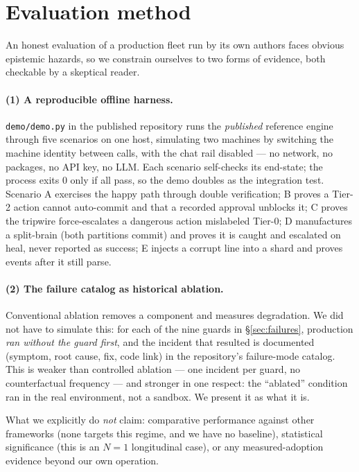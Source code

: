 \documentclass[11pt]{article}
\begin{document}
\section{Evaluation method}\label{sec:eval-method}
An honest evaluation of a production fleet run by its own authors faces obvious epistemic hazards, so we constrain ourselves to two forms of evidence, both checkable by a skeptical reader.

\paragraph{(1) A reproducible offline harness.} \texttt{demo/demo.py} in the published repository runs the \emph{published} reference engine through five scenarios on one host, simulating two machines by switching the machine identity between calls, with the chat rail disabled --- no network, no packages, no API key, no LLM. Each scenario self-checks its end-state; the process exits 0 only if all pass, so the demo doubles as the integration test. Scenario A exercises the happy path through double verification; B proves a Tier-2 action cannot auto-commit and that a recorded approval unblocks it; C proves the tripwire force-escalates a dangerous action mislabeled Tier-0; D manufactures a split-brain (both partitions commit) and proves it is caught and escalated on heal, never reported as success; E injects a corrupt line into a shard and proves events after it still parse.

\paragraph{(2) The failure catalog as historical ablation.} Conventional ablation removes a component and measures degradation. We did not have to simulate this: for each of the nine guards in \S\ref{sec:failures}, production \emph{ran without the guard first}, and the incident that resulted is documented (symptom, root cause, fix, code link) in the repository's failure-mode catalog. This is weaker than controlled ablation --- one incident per guard, no counterfactual frequency --- and stronger in one respect: the ``ablated'' condition ran in the real environment, not a sandbox. We present it as what it is.

What we explicitly do \emph{not} claim: comparative performance against other frameworks (none targets this regime, and we have no baseline), statistical significance (this is an $N{=}1$ longitudinal case), or any measured-adoption evidence beyond our own operation.
\end{document}
